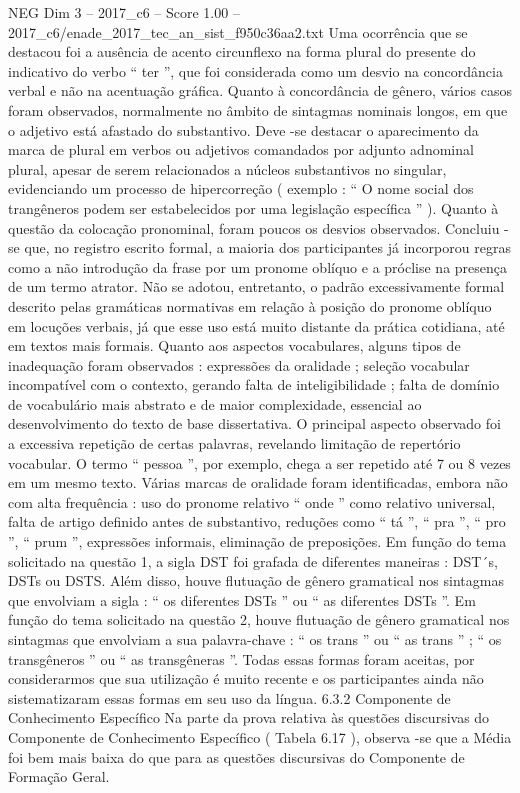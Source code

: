 \begin{textsample}{NEG Dim 3 – 2017\_c6 – Score 1.00 – 2017\_c6/enade\_2017\_tec\_an\_sist\_f950c36aa2.txt}
Uma ocorrência que se destacou foi a ausência de acento circunflexo na forma plural do presente do indicativo do verbo “ ter ”, que foi considerada como um desvio na concordância verbal e não na acentuação gráfica.
Quanto à concordância de gênero, vários casos foram observados, normalmente no âmbito de sintagmas nominais longos, em que o adjetivo está afastado do substantivo.
Deve -se destacar o aparecimento da marca de plural em verbos ou adjetivos comandados por adjunto adnominal plural, apesar de serem relacionados a núcleos substantivos no singular, evidenciando um processo de hipercorreção ( exemplo : “ O nome social dos trangêneros podem ser estabelecidos por uma legislação específica ” ).
Quanto à questão da colocação pronominal, foram poucos os desvios observados.
Concluiu -se que, no registro escrito formal, a maioria dos participantes já incorporou regras como a não introdução da frase por um pronome oblíquo e a próclise na presença de um termo atrator.
Não se adotou, entretanto, o padrão excessivamente formal descrito pelas gramáticas normativas em relação à posição do pronome oblíquo em locuções verbais, já que esse uso está muito distante da prática cotidiana, até em textos mais formais.
Quanto aos aspectos vocabulares, alguns tipos de inadequação foram observados : expressões da oralidade ; seleção vocabular incompatível com o contexto, gerando falta de inteligibilidade ; falta de domínio de vocabulário mais abstrato e de maior complexidade, essencial ao desenvolvimento do texto de base dissertativa.
O principal aspecto observado foi a excessiva repetição de certas palavras, revelando limitação de repertório vocabular.
O termo “ pessoa ”, por exemplo, chega a ser repetido até 7 ou 8 vezes em um mesmo texto.
Várias marcas de oralidade foram identificadas, embora não com alta frequência : uso do pronome relativo “ onde ” como relativo universal, falta de artigo definido antes de substantivo, reduções como “ tá ”, “ pra ”, “ pro ”, “ prum ”, expressões informais, eliminação de preposições.
Em função do tema solicitado na questão 1, a sigla DST foi grafada de diferentes maneiras : DST´s, DSTs ou DSTS.
Além disso, houve flutuação de gênero gramatical nos sintagmas que envolviam a sigla : “ os diferentes DSTs ” ou “ as diferentes DSTs ”.
Em função do tema solicitado na questão 2, houve flutuação de gênero gramatical nos sintagmas que envolviam a sua palavra-chave : “ os trans ” ou “ as trans ” ; “ os transgêneros ” ou “ as transgêneras ”.
Todas essas formas foram aceitas, por considerarmos que sua utilização é muito recente e os participantes ainda não sistematizaram essas formas em seu uso da língua. 6.3.2 Componente de Conhecimento Específico Na parte da prova relativa às questões discursivas do Componente de Conhecimento Específico ( Tabela 6.17 ), observa -se que a Média foi bem mais baixa do que para as questões discursivas do Componente de Formação Geral.

\end{textsample}
